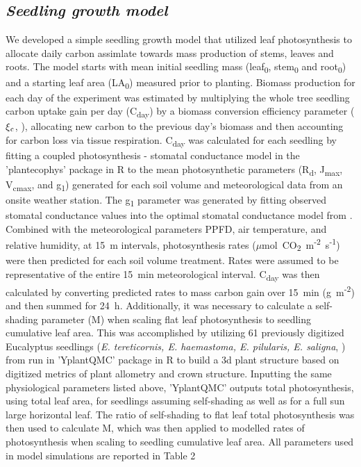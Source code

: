 \documentclass[a4paper]{article}\usepackage[]{graphicx}\usepackage[]{color}
\begin{document}
\subsection*{\textit{Seedling growth model}}
We developed a simple seedling growth model that utilized leaf photosynthesis to allocate daily carbon assimlate towards mass production of stems, leaves and roots. The model starts with mean initial seedling mass (leaf\textsubscript{0}, stem\textsubscript{0} and root\textsubscript{0}) and a starting leaf area (LA\textsubscript{0}) measured prior to planting. Biomass production for each day of the experiment was estimated by multiplying the whole tree seedling carbon uptake gain per day (C\textsubscript{day}) by a biomass conversion efficiency parameter ($\xi\textsubscript{c}$, \cite{zhu2008maximum}), allocating new carbon to the previous day’s biomass and then accounting for carbon loss via tissue respiration. C\textsubscript{day} was calculated for each seedling by fitting a coupled photosynthesis - stomatal conductance model \cite{farquhar1980biochemical,farquhar1982stomatal,medlyn2002temperature} in the 'plantecophys' package in R \cite{plantecophys} to the mean photosynthetic parameters (R\textsubscript{d}, J\textsubscript{max}, V\textsubscript{cmax}, and g\textsubscript{1}) generated for each soil volume and meteorological data from an onsite weather station.  The g\textsubscript{1} parameter was generated by fitting observed stomatal conductance values into the optimal stomatal conductance model from \cite{medlyn2012reconciling}.  Combined with the meteorological parameters PPFD, air temperature, and relative humidity, at 15~m intervals, photosynthesis rates ($\mu$mol~CO\textsubscript{2}~m\textsuperscript{-2}~s\textsuperscript{-1}) were then predicted for each soil volume treatment. Rates were assumed to be representative of the entire 15~min meteorological interval. C\textsubscript{day} was then calculated by converting predicted rates to mass carbon gain over 15~min (g~m\textsuperscript{-2}) and then summed for 24~h. Additionally, it was necessary to calculate a self-shading parameter (M) when scaling flat leaf photosynthesis to seedling cumulative leaf area.  This was accomplished by utilizing 61 previously digitized Eucalyptus seedlings (\textit{E. tereticornis, E. haemastoma, E. pilularis, E. saligna}, \cite{duursma2012light}) from run in 'YplantQMC' package in R \cite{yplantqmc} to build a 3d plant structure based on digitized metrics of plant allometry and crown structure. Inputting the same physiological parameters listed above, 'YplantQMC' outputs total photosynthesis, using total leaf area, for seedlings assuming self-shading as well as for a full sun large horizontal leaf.  The ratio of self-shading to flat leaf total photosynthesis was then used to calculate M, which was then applied to modelled rates of photosynthesis when scaling to seedling cumulative leaf area. All parameters used in model simulations are reported in Table 2
\end{document}
